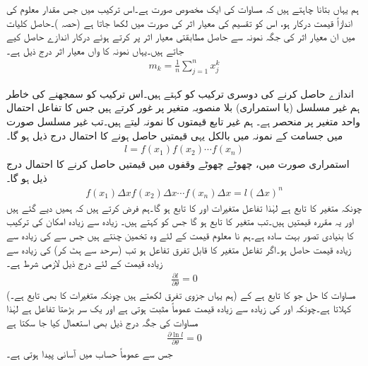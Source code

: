 ہم یہاں بتانا چاہتے ہیں کہ مساوات   کی ایک مخصوص صورت ہے۔اس ترکیب میں جس مقدار معلوم کی اندازاً قیمت درکار ہو، اس کو تقسیم کی معیار اثر کی صورت میں لکھا جاتا ہے (حصہ )۔حاصل کلیات میں ان معیار اثر کی جگہ نمونہ سے حاصل مطابقتی معیار اثر  پر کرتے ہوئے درکار اندازے حاصل کیے جاتے ہیں۔یہاں نمونہ  کا  واں معیار اثر درج ذیل ہے۔
\begin{align*}
m_k=\frac{1}{n}\sum_{j=1}^{n}x_j^k
\end{align*}

اندازے حاصل کرنے کی دوسری ترکیب کو  کہتے ہیں۔اس ترکیب کو سمجھنے کی خاطر ہم غیر مسلسل (یا استمراری) بلا منصوبہ متغیر  پر غور کرتے ہیں جس کا تفاعل احتمال واحد  متغیر  پر منحصر ہے۔ ہم  غیر تابع قیمتوں  کا نمونہ لیتے ہیں۔تب غیر مسلسل صورت میں  جسامت کے نمونہ میں بالکل یہی قیمتیں حاصل ہونے کا احتمال درج ذیل ہو گا۔
\begin{align}\label{مساوات_شماریات_غیر_تابع_کا_احتمال}
l=f(x_1)f(x_2)\cdots f(x_n)
\end{align}
استمراری صورت میں،  چھوٹے چھوٹے وقفوں   میں قیمتیں حاصل کرنے کا احتمال درج ذیل ہو گا۔
\begin{align}
f(x_1)\Delta x f(x_2)\Delta x\cdots f(x_n)\Delta x=l(\Delta x)^n
\end{align} 
چونکہ  متغیر  کا تابع ہے لہٰذا تفاعل  متغیرات  اور  کا تابع ہو گا۔ہم فرض کرتے ہیں کہ ہمیں  دیے گئے ہیں اور یہ مقررہ قیمتیں ہیں۔تب  متغیر  کا تابع ہو گا جس کو  کہتے ہیں۔ زیادہ سے زیادہ امکان کی ترکیب کا بنیادی تصور بہت سادہ ہے۔ہم نا معلوم قیمت  کے لئے وہ تخمین چنتے ہیں جس سے  کی زیادہ سے زیادہ قیمت حاصل ہو۔اگر تفاعل  متغیر  کا قابل تفرق تفاعل ہو تب (سرحد سے ہٹ کر)  کی زیادہ سے زیادہ قیمت کے لئے درج ذیل  لازمی شرط ہے۔
\begin{align}\label{مساوات_شماریات_زیادہ_سے_زیادہ_الف}
\frac{\partial l}{\partial \theta}=0
\end{align}
(ہم یہاں جزوی تفرق لکھتے ہیں چونکہ  متغیرات  کا بھی تابع ہے۔) مساوات  کا حل جو  کا تابع ہے  کے   کہلاتا ہے۔چونکہ  اور  کی زیادہ سے زیادہ قیمت عموماً مثبت ہوتی ہے اور   یک سر بڑھتا تفاعل ہے لہٰذا مساوات  کی جگہ درج ذیل بھی استعمال کیا جا سکتا ہے
\begin{align}\label{مساوات_شماریات_زیادہ_سے_زیادہ_ب}
\frac{\partial \ln l}{\partial \theta}=0
\end{align}
 جس سے عموماً حساب میں آسانی پیدا ہوتی ہے۔

